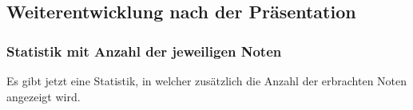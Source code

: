 \documentclass[a4paper,10pt]{scrartcl}
\begin{document}
\noindent{}
\medskip


\noindent{}
\medskip

\subsection{Weiterentwicklung nach der Präsentation}

\subsubsection*{Statistik mit Anzahl der jeweiligen Noten}

Es gibt jetzt eine Statistik, in welcher zusätzlich die Anzahl der erbrachten Noten angezeigt wird.

\noindent{}
\medskip
\end{document}
